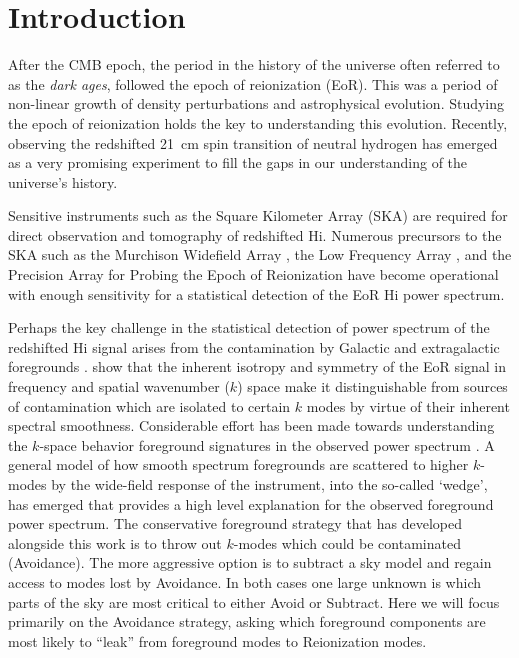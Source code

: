 \documentclass[preprint2,iop,numberedappendix]{emulateapj}
\begin{document}

\section{Introduction}\label{intro}

After the CMB epoch, the period in the history of the universe often referred to as the {\it dark ages}, followed the epoch of reionization (EoR). This was a period of non-linear growth of density perturbations and astrophysical evolution. Studying the epoch of reionization holds the key to understanding this evolution. Recently, observing the redshifted 21~cm spin transition of neutral hydrogen has emerged as a very promising experiment to fill the gaps in our understanding of the universe's history.  

Sensitive instruments such as the Square Kilometer Array (SKA) are required for direct observation and tomography of redshifted H{\sc i}. Numerous precursors to the SKA such as the Murchison Widefield Array \citep[MWA;][]{lon09,tin13}, the Low Frequency Array \citep[LOFAR;][]{van13}, and the Precision Array for Probing the Epoch of Reionization \citep[PAPER;][]{par10} have become operational with enough sensitivity for a statistical detection of the EoR H{\sc i} power spectrum. 

Perhaps the key challenge in the statistical detection of power spectrum of the redshifted H{\sc i} signal arises from the contamination by Galactic and extragalactic foregrounds \citep[see, e.g.,][]{dim02,zal04,fur06}. \citet{mor04} show that the inherent isotropy and symmetry of the EoR signal in frequency and spatial wavenumber ($k$) space make it distinguishable from sources of contamination which are isolated to certain $k$ modes by virtue of their inherent spectral smoothness\citep{mor06,bow09,liu11,par12,dil13}.  Considerable effort has been made towards understanding the $k$-space behavior foreground signatures in the observed power spectrum \citep{thy13,pob13,mor12,tro12,dat10,bow09}.  A general model of how smooth spectrum foregrounds are scattered to higher $k$-modes by the wide-field response of the instrument, into the so-called `wedge',  has emerged that provides a high level explanation for the observed foreground power spectrum. The conservative foreground strategy that has developed alongside this work is to throw out $k$-modes which could be contaminated (Avoidance).  The more aggressive option is to subtract a sky model and regain access to modes lost by Avoidance. In both cases one large unknown is which parts of the sky are most critical to either Avoid or Subtract. Here we will focus primarily on the Avoidance strategy, asking which foreground components are most likely to ``leak'' from foreground modes to Reionization modes.
\end{document}
